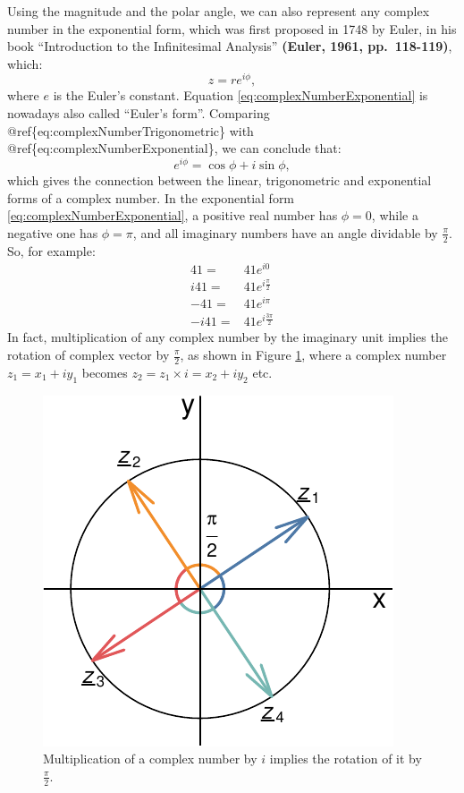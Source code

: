 \documentclass[
]{book}
\begin{document}
Using the magnitude and the polar angle, we can also represent any complex number in the exponential form, which was first proposed in 1748 by Euler, in his book ``Introduction to the Infinitesimal Analysis'' \textbf{(Euler, 1961, pp.~118-119)}, which:
\begin{equation}
    z = r e^{i \phi} ,
    \label{eq:complexNumberExponential}
\end{equation}
where \(e\) is the Euler's constant. Equation \eqref{eq:complexNumberExponential} is nowadays also called ``Euler's form''. Comparing @ref\{eq:complexNumberTrigonometric\} with @ref\{eq:complexNumberExponential\}, we can conclude that:
\begin{equation}
    e^{i \phi} = \cos \phi + i \sin \phi ,
    \label{eq:EulerFormula}
\end{equation}
which gives the connection between the linear, trigonometric and exponential forms of a complex number. In the exponential form \eqref{eq:complexNumberExponential}, a positive real number has \(\phi=0\), while a negative one has \(\phi=\pi\), and all imaginary numbers have an angle dividable by \(\frac{\pi}{2}\). So, for example:
\begin{equation*}
    \begin{aligned}
    41 = & 41 e^{i 0} \\
    i41 = & 41 e^{i \frac{\pi}{2}} \\
    -41 = & 41 e^{i \pi} \\
    -i41 = & 41 e^{i \frac{3 \pi}{2}}
    \end{aligned}
\end{equation*}
In fact, multiplication of any complex number by the imaginary unit implies the rotation of complex vector by \(\frac{\pi}{2}\), as shown in Figure \ref{fig:complexPlaneMultiplication}, where a complex number \(z_1 = x_1 + i y_1\) becomes \(z_2 = z_1 \times i = x_2 + i y_2\) etc.

\begin{figure}
\centering
\includegraphics{Svetunkov---Svetunkov---Complex-Dynamic-Models_files/figure-latex/complexPlaneMultiplication-1.pdf}
\caption{\label{fig:complexPlaneMultiplication}Multiplication of a complex number by \(i\) implies the rotation of it by \(\frac{\pi}{2}\).}
\end{figure}
\end{document}
